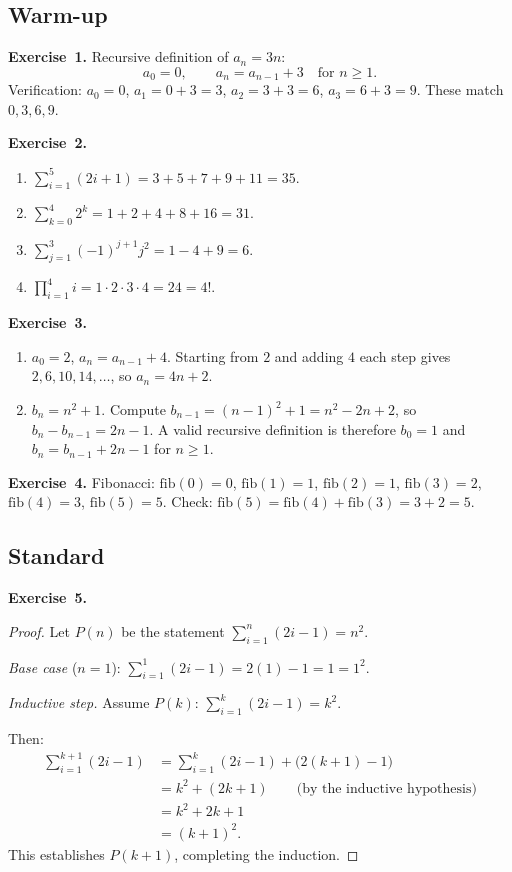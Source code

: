 \documentclass[11pt]{article}
\begin{document}
\subsection*{Warm-up}

\textbf{Exercise~1.}
Recursive definition of $a_n = 3n$:
\[
  a_0 = 0, \qquad a_n = a_{n-1} + 3 \quad \text{for } n \geq 1.
\]
Verification: $a_0 = 0$, $a_1 = 0 + 3 = 3$, $a_2 = 3 + 3 = 6$,
$a_3 = 6 + 3 = 9$. These match $0, 3, 6, 9$. \checkmark

\medskip
\textbf{Exercise~2.}
\begin{enumerate}[label=(\alph*)]
  \item $\sum_{i=1}^{5}(2i+1) = 3 + 5 + 7 + 9 + 11 = 35$.
  \item $\sum_{k=0}^{4} 2^k = 1 + 2 + 4 + 8 + 16 = 31$.
  \item $\sum_{j=1}^{3}(-1)^{j+1} j^2 = 1 - 4 + 9 = 6$.
  \item $\prod_{i=1}^{4} i = 1 \cdot 2 \cdot 3 \cdot 4 = 24 = 4!$.
\end{enumerate}

\medskip
\textbf{Exercise~3.}
\begin{enumerate}[label=(\alph*)]
  \item $a_0 = 2$, $a_n = a_{n-1} + 4$. Starting from $2$ and adding $4$ each step gives $2, 6, 10, 14, \ldots$, so $a_n = 4n + 2$.
  \item $b_n = n^2 + 1$. Compute $b_{n-1} = (n-1)^2 + 1 = n^2 - 2n + 2$, so $b_n - b_{n-1} = 2n - 1$. A valid recursive definition is therefore $b_0 = 1$ and $b_n = b_{n-1} + 2n - 1$ for $n \geq 1$.
\end{enumerate}

\medskip
\textbf{Exercise~4.}
Fibonacci: $\text{fib}(0) = 0$, $\text{fib}(1) = 1$, $\text{fib}(2) = 1$, $\text{fib}(3) = 2$, $\text{fib}(4) = 3$, $\text{fib}(5) = 5$. Check: $\text{fib}(5) = \text{fib}(4) + \text{fib}(3) = 3 + 2 = 5$. \checkmark

\subsection*{Standard}

\textbf{Exercise~5.}
\begin{proof}
Let $P(n)$ be the statement
$\displaystyle\sum_{i=1}^{n}(2i-1) = n^2$.

\emph{Base case} ($n = 1$):
$\displaystyle\sum_{i=1}^{1}(2i - 1) = 2(1) - 1 = 1 = 1^2$. \checkmark

\emph{Inductive step.} Assume $P(k)$:
$\displaystyle\sum_{i=1}^{k}(2i-1) = k^2$.

Then:
\begin{align*}
  \sum_{i=1}^{k+1}(2i - 1)
    &= \sum_{i=1}^{k}(2i - 1) + \bigl(2(k+1) - 1\bigr) \\
    &= k^2 + (2k + 1) \qquad\text{(by the inductive hypothesis)} \\
    &= k^2 + 2k + 1 \\
    &= (k+1)^2.
\end{align*}
This establishes $P(k+1)$, completing the induction.
\end{proof}
\end{document}
